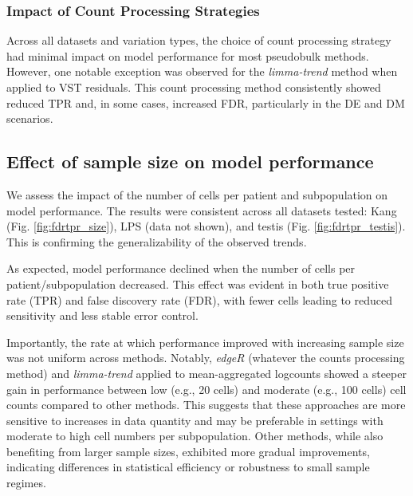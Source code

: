 \documentclass[a4paper, 11pt, twocolumn]{article}
\begin{document}
\begin{multicols}{2}
\subsubsection{Impact of Count Processing Strategies}
Across all datasets and variation types, the choice of count processing strategy had minimal impact on model performance for most pseudobulk methods. However, one notable exception was observed for the \textit{limma-trend} method when applied to VST residuals. This count processing method consistently showed reduced TPR and, in some cases, increased FDR, particularly in the DE and DM scenarios.

\subsection{Effect of sample size on model performance}

We assess the impact of the number of cells per patient and subpopulation on model performance. The results were consistent across all datasets tested: Kang (Fig. \ref{fig:fdrtpr_size}), LPS (data not shown), and testis (Fig. \ref{fig:fdrtpr_testis}). This is confirming the generalizability of the observed trends.

As expected, model performance declined when the number of cells per patient/subpopulation decreased. This effect was evident in both true positive rate (TPR) and false discovery rate (FDR), with fewer cells leading to reduced sensitivity and less stable error control.

Importantly, the rate at which performance improved with increasing sample size was not uniform across methods. Notably, \textit{edgeR} (whatever the counts processing method) and \textit{limma-trend} applied to mean-aggregated logcounts showed a steeper gain in performance between low (e.g., 20 cells) and moderate (e.g., 100 cells) cell counts compared to other methods. This suggests that these approaches are more sensitive to increases in data quantity and may be preferable in settings with moderate to high cell numbers per subpopulation. Other methods, while also benefiting from larger sample sizes, exhibited more gradual improvements, indicating differences in statistical efficiency or robustness to small sample regimes.

\end{multicols}
\end{document}

